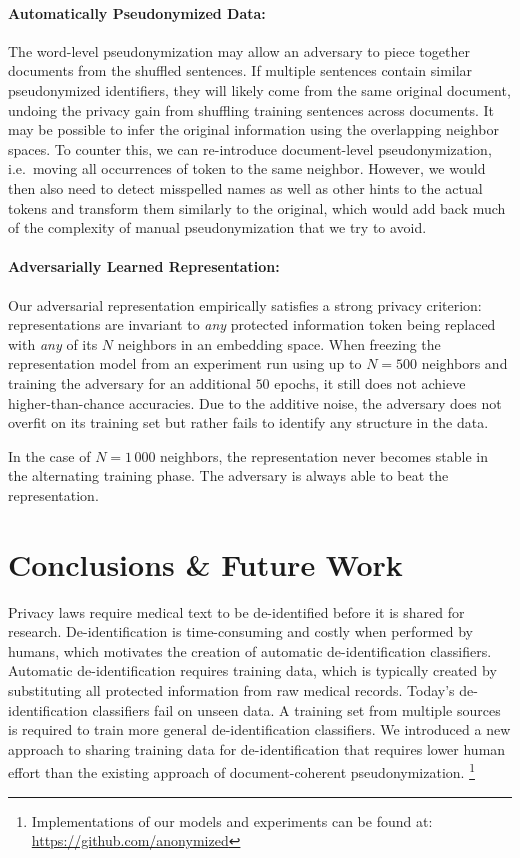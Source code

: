 \paragraph{Automatically Pseudonymized Data:}
%
The word-level pseudonymization may allow an adversary to piece together documents from the shuffled sentences.
%
If multiple sentences contain similar pseudonymized identifiers, they will likely come from the same original document, undoing the privacy gain from shuffling training sentences across documents.
%
It may be possible to infer the original information using the overlapping neighbor spaces.
%
To counter this, we can re-introduce document-level pseudonymization, i.e.\ moving all occurrences of  token to the same neighbor.
%
However, we would then also need to detect misspelled names as well as other hints to the actual tokens and transform them similarly to the original, which would add back much of the complexity of manual pseudonymization that we try to avoid.

\paragraph{Adversarially Learned Representation:}
%
Our adversarial representation empirically satisfies a strong privacy criterion: representations are invariant to \textit{any} protected information token being replaced with \textit{any} of its $N$ neighbors in an embedding space.
%
When freezing the representation model from an experiment run using up to $N = 500$ neighbors and training the adversary for an additional $50$ epochs, it still does not achieve higher-than-chance accuracies.
%
Due to the additive noise, the adversary does not overfit on its training set but rather fails to identify any structure in the data.

%
In the case of $N = 1\,000$ neighbors, the representation never becomes stable in the alternating training phase.
%
The adversary is always able to beat the representation.

\section{Conclusions \& Future Work}
%
Privacy laws require medical text to be de-identified before it is shared for research.
%
De-identifi\-ca\-tion is time-consuming and costly when performed by humans, which motivates the creation of automatic de-identification classifiers.
%
Automatic de-identification requires training data, which is typically created by substituting all protected information from raw medical records.
%
Today's de-identification classifiers fail on unseen data.
%
A training set from multiple sources is required to train more general de-identification classifiers.
%
We introduced a new approach to sharing training data for de-identification that requires lower human effort than the existing approach of document-coherent pseudonymization.
\footnote{Implementations of our models and experiments can be found at: \url{https://github.com/anonymized}}

